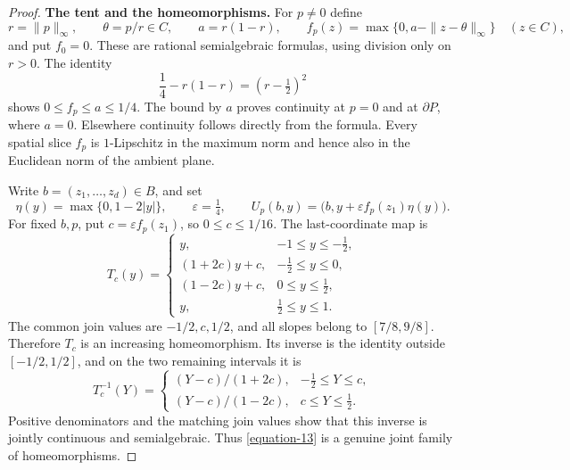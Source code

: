 \documentclass[11pt,a4paper]{article}
\theoremstyle{definition}
\begin{document}
\begin{proof}
\textbf{The tent and the homeomorphisms.}
For $p\ne0$ define
\begin{equation}
 r=\|p\|_\infty,\qquad \theta=p/r\in C,\qquad
 a=r(1-r),\qquad
 f_p(z)=\max\{0,a-\|z-\theta\|_\infty\}\quad(z\in C),
 \label{equation-11}
\end{equation}
and put $f_0=0$. These are rational semialgebraic formulas, using
division only on $r>0$. The identity
\begin{equation}
           \frac14-r(1-r)=(r-\tfrac12)^2
 \label{equation-12}
\end{equation}
shows $0\le f_p\le a\le1/4$. The bound by $a$ proves continuity
at $p=0$ and at $\partial P$, where $a=0$. Elsewhere continuity
follows directly from the formula. Every spatial slice $f_p$ is
$1$-Lipschitz in the maximum norm and hence also in the Euclidean
norm of the ambient plane.

Write $b=(z_1,\ldots,z_d)\in B$, and set
\begin{equation}
 \eta(y)=\max\{0,1-2|y|\},\qquad \varepsilon=\tfrac14,\qquad
 U_p(b,y)=\bigl(b,y+\varepsilon f_p(z_1)\eta(y)\bigr).
 \label{equation-13}
\end{equation}
For fixed $b,p$, put $c=\varepsilon f_p(z_1)$, so
$0\le c\le1/16$. The last-coordinate map is
\begin{equation}
 T_c(y)=
 \begin{cases}
 y,&-1\le y\le-\tfrac12,\\
 (1+2c)y+c,&-\tfrac12\le y\le0,\\
 (1-2c)y+c,&0\le y\le\tfrac12,\\
 y,&\tfrac12\le y\le1.
 \end{cases}
 \label{equation-14}
\end{equation}
The common join values are $-1/2,c,1/2$, and all slopes belong to
$[7/8,9/8]$. Therefore $T_c$ is an increasing homeomorphism.
Its inverse is the identity outside $[-1/2,1/2]$, and on the
two remaining intervals it is
\begin{equation}
 T_c^{-1}(Y)=
 \begin{cases}
 (Y-c)/(1+2c),&-\tfrac12\le Y\le c,\\
 (Y-c)/(1-2c),&c\le Y\le\tfrac12.
 \end{cases}
 \label{equation-15}
\end{equation}
Positive denominators and the matching join values show that
this inverse is jointly continuous and semialgebraic. Thus
\eqref{equation-13} is a genuine joint family of homeomorphisms.


\end{proof}
\end{document}

